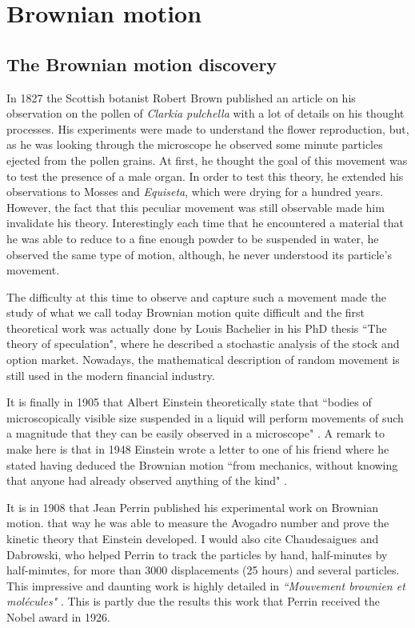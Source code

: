 \section{Brownian motion}
	\label{sec:chapter1}
	
\subsection{The Brownian motion discovery}


	
In 1827 the Scottish botanist Robert Brown published an article \cite{robert_xxvii_1828} on his observation on the pollen of \textit{Clarkia pulchella} with a lot of details on his thought processes. His experiments were made to understand the flower reproduction, but, as he was looking through the microscope he observed some minute particles ejected from the pollen grains. At first, he thought the goal of this movement was to test the presence of a male organ. In order to test this theory, he extended his observations to Mosses and \textit{Equiseta}, which were drying for a hundred years. However, the fact that this peculiar movement was still observable made him invalidate his theory. Interestingly each time that he encountered a material that he was able to reduce to a fine enough powder to be suspended in water, he observed the same type of motion, although, he never understood its particle's movement.

The difficulty at this time to observe and capture such a movement made the study of what we call today Brownian motion quite difficult and the first theoretical work was actually done by Louis Bachelier in his PhD thesis ``The theory of speculation", where he described a stochastic analysis of the stock and option market. Nowadays, the mathematical description of random movement is still used in the modern financial industry. 

It is finally in 1905 that Albert Einstein theoretically state that ``bodies of microscopically visible size suspended in a liquid will perform movements of such a magnitude that they can be easily observed in a microscope" \cite{einstein_uber_1905}. A remark to make here is that in 1948 Einstein wrote a letter to one of his friend where he stated having deduced the Brownian motion ``from mechanics, without knowing that anyone had already observed anything of the kind" \cite{peter_brownian_nodate}.

It is in 1908 that Jean Perrin published his experimental work on Brownian motion. that way he was able to measure the Avogadro number and prove the kinetic theory that Einstein developed. I would also cite Chaudesaigues and Dabrowski, who helped Perrin to track the particles by hand, half-minutes by half-minutes, for more than 3000 displacements (25 hours) and several particles. This impressive and daunting work is highly detailed in \textit{``Mouvement brownien et molécules"} \cite{perrin_mouvement_1910}. This is partly due the results this work that Perrin received the Nobel award in 1926.

